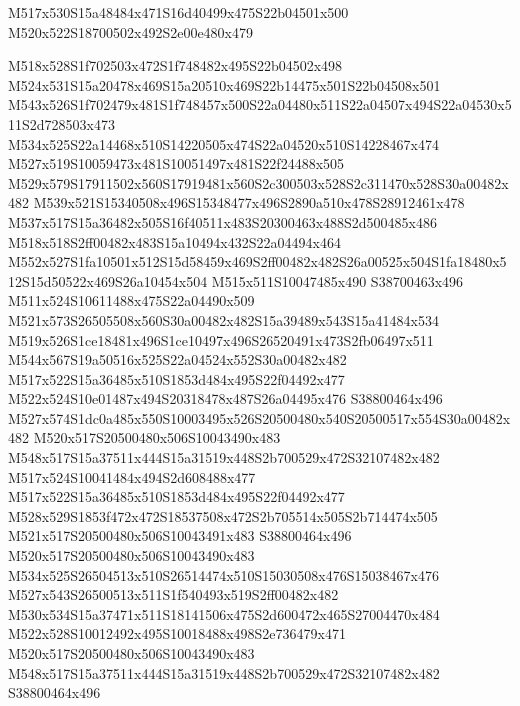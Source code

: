 \documentclass{article}
\begin{document}
\begin{multicols}{2}



\begin{center}
M517x530S15a48484x471S16d40499x475S22b04501x500 M520x522S18700502x492S2e00e480x479 
\end{center}



M518x528S1f702503x472S1f748482x495S22b04502x498 M524x531S15a20478x469S15a20510x469S22b14475x501S22b04508x501 M543x526S1f702479x481S1f748457x500S22a04480x511S22a04507x494S22a04530x511S2d728503x473 M534x525S22a14468x510S14220505x474S22a04520x510S14228467x474 M527x519S10059473x481S10051497x481S22f24488x505 M529x579S17911502x560S17919481x560S2c300503x528S2c311470x528S30a00482x482 M539x521S15340508x496S15348477x496S2890a510x478S28912461x478 M537x517S15a36482x505S16f40511x483S20300463x488S2d500485x486 M518x518S2ff00482x483S15a10494x432S22a04494x464 M552x527S1fa10501x512S15d58459x469S2ff00482x482S26a00525x504S1fa18480x512S15d50522x469S26a10454x504 M515x511S10047485x490 S38700463x496 M511x524S10611488x475S22a04490x509 M521x573S26505508x560S30a00482x482S15a39489x543S15a41484x534 M519x526S1ce18481x496S1ce10497x496S26520491x473S2fb06497x511 M544x567S19a50516x525S22a04524x552S30a00482x482 M517x522S15a36485x510S1853d484x495S22f04492x477 M522x524S10e01487x494S20318478x487S26a04495x476 S38800464x496 M527x574S1dc0a485x550S10003495x526S20500480x540S20500517x554S30a00482x482 M520x517S20500480x506S10043490x483 M548x517S15a37511x444S15a31519x448S2b700529x472S32107482x482 M517x524S10041484x494S2d608488x477 M517x522S15a36485x510S1853d484x495S22f04492x477 M528x529S1853f472x472S18537508x472S2b705514x505S2b714474x505 M521x517S20500480x506S10043491x483 S38800464x496 M520x517S20500480x506S10043490x483 M534x525S26504513x510S26514474x510S15030508x476S15038467x476 M527x543S26500513x511S1f540493x519S2ff00482x482 M530x534S15a37471x511S18141506x475S2d600472x465S27004470x484 M522x528S10012492x495S10018488x498S2e736479x471 M520x517S20500480x506S10043490x483 M548x517S15a37511x444S15a31519x448S2b700529x472S32107482x482 S38800464x496


\end{multicols}
\end{document}
